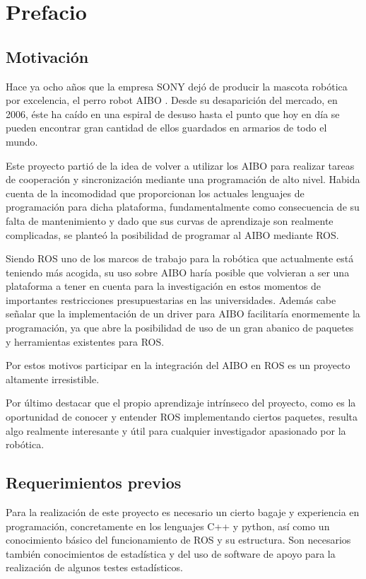 \documentclass[12pt,a4paper,final,twoside]{book}
\begin{document}
\newpage
\thispagestyle{empty}
{}
\tableofcontents
\thispagestyle{fancy}
\newpage
{}
\listoffigures
\thispagestyle{fancy}
\newpage
{}
\listoftables
\thispagestyle{fancy}
\newpage


\chapter{Prefacio}
\thispagestyle{fancy}
\section{Motivación}
 
Hace ya ocho años que la empresa SONY dejó de producir la mascota robótica por excelencia, el perro robot AIBO \cite{aibo}. Desde su desaparición del mercado, en 2006, éste ha caído en una espiral de desuso hasta el punto que hoy en día se pueden encontrar gran cantidad de ellos guardados en armarios de todo el mundo.

Este proyecto partió de la idea de volver a utilizar los AIBO para realizar tareas de cooperación y sincronización mediante una programación de alto nivel. Habida cuenta de la incomodidad que proporcionan los actuales lenguajes de programación para dicha plataforma, fundamentalmente como consecuencia de su falta de mantenimiento y dado que sus curvas de aprendizaje son realmente complicadas, se planteó la posibilidad de programar al AIBO mediante ROS\cite{ros}.

Siendo ROS uno de los marcos de trabajo para la robótica que actualmente está teniendo más acogida, su uso sobre AIBO haría posible que volvieran a ser una plataforma a tener en cuenta para la investigación en estos momentos de importantes restricciones presupuestarias en las universidades. Además cabe señalar que la implementación de un driver para AIBO facilitaría enormemente la programación, ya que abre la posibilidad de uso de un gran abanico de paquetes y herramientas existentes para ROS.

Por estos motivos participar en la integración del AIBO en ROS es un proyecto altamente irresistible.

Por último destacar que el propio aprendizaje intrínseco del proyecto, como es la oportunidad de conocer y entender ROS implementando ciertos paquetes, resulta algo realmente interesante y útil para cualquier investigador apasionado por la robótica.


\section{Requerimientos previos}
Para la realización de este proyecto es necesario un cierto bagaje y experiencia en programación, concretamente en los lenguajes C++ y python, así como un conocimiento básico del funcionamiento de ROS y su estructura.
Son necesarios también conocimientos de estadística y del uso de software de apoyo para la realización de algunos testes estadísticos.
\newpage
\clearpage
\end{document}
